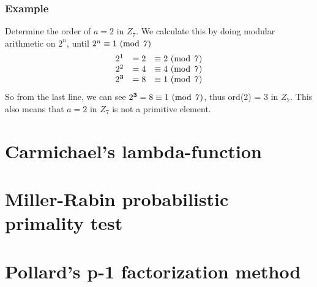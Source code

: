 \documentclass{article}
\begin{document}
	\subsubsection*{Example}
	Determine the order of $a = 2$ in $Z_7$. We calculate this by doing modular arithmetic on $2^n$, until $2^n \equiv 1 \text{ (mod \textit{7})}$
	\[
	\begin{matrix*}{}
		2^1&=2 &\equiv 2 \text{ (mod \textit{7})}\\
		2^2&=4 &\equiv 4 \text{ (mod \textit{7})}\\
		2^\textbf{3}&=8 &\equiv 1 \text{ (mod \textit{7})}\\
	\end{matrix*}
	\]
	So from the last line, we can see $2^\textbf{3}=8 \equiv 1 \text{ (mod \textit{7})}$, thus ord(2) = 3 in $Z_7$. This also means that $a = 2$ in $Z_7$ is not a primitive element.
	
	\section*{Carmichael's lambda-function \cite{carmite}} 
	
	
	\section*{Miller-Rabin probabilistic primality test}
	
	\section*{Pollard's p-1 factorization method}
	 

	\newpage
\end{document}
